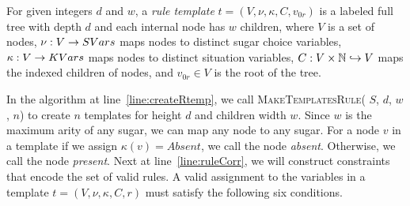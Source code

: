 \begin{df}
For given integers $d$ and $w$,
a {\em rule template} $t = (V, \nu, \kappa, C, v_{0r})$ is a labeled full tree with depth $d$ and 
each internal node has $w$ children, where 
$V$ is a set of nodes, $\nu : V \rightarrow SVars$ maps nodes to distinct
sugar choice variables, 
$\kappa : V \rightarrow KVars$ maps nodes to distinct situation variables,
$C : V \times \mathbb{N} \hookrightarrow V$ maps the indexed children of nodes,
and
$v_{0r} \in V$ is the root of the tree.
\end{df}
In the algorithm at line~\ref{line:createRtemp}, we call \textsc{MakeTemplatesRule}( $S$, $d$, $w$, $n$) to create $n$ templates for
height $d$ and children width $w$.
Since $w$ is the maximum arity of any sugar, we can map any node to any sugar.
For a node $v$ in a template if we assign $\kappa(v) = Absent$,
we call the node {\em absent}. Otherwise, we call the node {\em present}.
Next at line~\ref{line:ruleCorr}, we will construct constraints
that encode the set of valid rules. 
A valid assignment to the variables in
a template  $t = (V, \nu, \kappa, C, r)$ must
satisfy the following six conditions.
